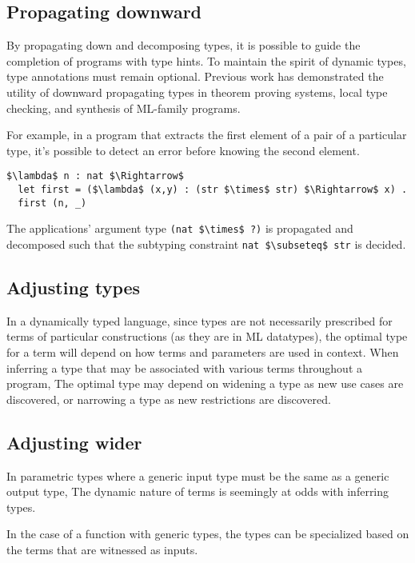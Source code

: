 \documentclass[sigplan,screen]{acmart}
\begin{document}
\subsection{Propagating downward}
By propagating down and decomposing types, 
it is possible to guide the completion of programs with type hints.
To maintain the spirit of dynamic types, type annotations must remain optional.
Previous work has demonstrated the utility of downward propagating types 
in theorem proving systems, local type checking, 
and synthesis of ML-family programs.

For example, in a program that extracts 
the first element of a pair of a particular type, 
it's possible to detect an error before knowing the second element.

\begin{lstlisting}
$\lambda$ n : nat $\Rightarrow$
  let first = ($\lambda$ (x,y) : (str $\times$ str) $\Rightarrow$ x) .
  first (n, _) 
\end{lstlisting}

\noindent The  applications' argument type \lstinline{(nat $\times$ ?)} 
is propagated and decomposed such that the subtyping constraint 
\lstinline{nat $\subseteq$ str} is decided. 

\subsection{Adjusting types}

In a dynamically typed language, since types are not necessarily prescribed
for terms of particular constructions (as they are in ML datatypes), 
the optimal type for a term will depend on how terms and parameters are used in context. 
When inferring a type that may be associated with various terms throughout a program,  
The optimal type may depend on widening a type as new use cases are discovered,
or narrowing a type as new restrictions are discovered. 

\subsection{Adjusting wider}

In parametric types where a generic input type must be the same as a generic output type,
The dynamic nature of terms is seemingly at odds with inferring types.

In the case of a function with generic types, 
the types can be specialized based on the terms that are witnessed as inputs. 
\end{document}
